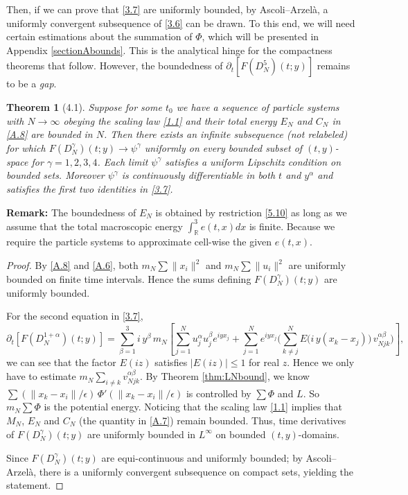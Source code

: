 \documentclass[11pt]{article}
\newtheorem{theorem}{Theorem}
\begin{document}
Then, if we can prove that \eqref{3.7} are uniformly bounded, by Ascoli–Arzelà, a uniformly convergent subsequence of \eqref{3.6} can be drawn. To this end, we will need certain estimations about the summation of $\Phi$, which will be presented in Appendix \ref{sectionAbounds}. This is the analytical hinge for the compactness theorems that follow. However, the boundedness of $\partial_t[F(D^{5}_N)(t;y)]$ remains to be a \emph{gap}. 

\begin{theorem}[4.1]\label{thm:5.3}
Suppose for some \(t_0\) we have a sequence of particle systems with \(N\to\infty\) obeying the scaling law \eqref{1.1} and their total energy $E_N$  and $C_N$ in \eqref{A.8} are bounded in $N$.
Then there exists an infinite subsequence (not relabeled) for which
\(F(D^\gamma_N)(t;y) \to \psi^\gamma\) uniformly on every bounded subset of \((t,y)\)-space
for \(\gamma=1,2,3,4\). Each limit \(\psi^\gamma\) satisfies a uniform Lipschitz condition on bounded sets.
Moreover \(\psi^\gamma\) is continuously differentiable in both \(t\) and \(y^\alpha\) and satisfies the first two identities in \eqref{3.7}.
\end{theorem}

\textbf{Remark:} The boundedness of $E_N$ is obtained by restriction \eqref{5.10} as long as we assume that the total macroscopic energy $\int_\mathbb{R}^3e(t,x)dx$ is finite. Because we require the particle systems to approximate cell-wise the given $e(t,x)$.

\begin{proof}
By \eqref{A.8} and \eqref{A.6}, both
\(m_ N\sum \|x_i\|^2\) and \(m_ N\sum \|u_i\|^2\) are uniformly bounded on finite time intervals. Hence the sums defining $F(D^\gamma_N)(t;y)$ are uniformly bounded. 

For the second equation in \eqref{3.7}, 
\[
\partial_t[F(D^{1+\alpha}_N)(t;y)] =\sum_{\beta=1}^3i\,y^\beta\, m_N[\sum_{j=1}^Nu^\alpha_ju_j^\beta e^{iy x_j}+\sum_{j=1}^{N} e^{iyx_j}
 \Big( \sum_{k\neq j}^{N} E\big(i\,y(x_k-x_j)\big)\, v_{Njk}^{\alpha\beta}\Big)],
\]
we can see that the factor \(E(iz)\) satisfies \(|E(iz)|\le 1\) for real \(z\). Hence we only have to estimate $m_ N\sum_{i\neq k}v_{Njk}^{\alpha\beta}$. By Theorem \ref{thm:LNbound}, we know $\sum (\|x_k-x_i\|/\epsilon)\,\Phi'(\|x_k-x_i\|/\epsilon)$ is controlled by $\sum \Phi$ and $L$. So $m_N\sum \Phi$ is the potential energy.  Noticing that the scaling law \eqref{1.1} implies that \(M_N\), \(E_N\) and \(C_N\) (the quantity in \eqref{A.7}) remain bounded. Thus, time derivatives of $F(D^\gamma_N)(t;y)$ are uniformly bounded in \(L^\infty\) on bounded \((t,y)\)-domains.

Since $F(D^\gamma_N)(t;y)$ are equi-continuous and uniformly bounded; by Ascoli–Arzelà, there is a uniformly convergent subsequence on compact sets, yielding the statement.
\end{proof}
\end{document}
